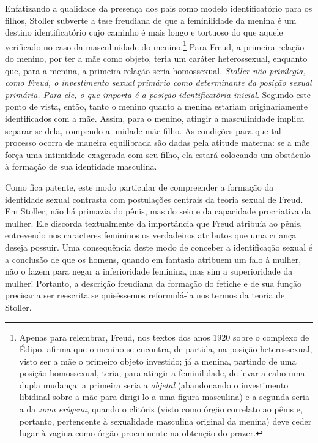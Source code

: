 Enfatizando a qualidade da presença dos pais como modelo identificatório
para os filhos, Stoller subverte a tese freudiana de que a feminilidade da
menina é um destino identificatório cujo caminho é mais longo e tortuoso do
que aquele verificado no caso da masculinidade do menino.\footnote{ Apenas
para relembrar, Freud, nos textos dos anos 1920 sobre o complexo de Édipo,
afirma que o menino se encontra, de partida, na posição heterossexual,
visto ser a mãe o primeiro objeto investido; já a menina, partindo de uma
posição homossexual, teria, para atingir a feminilidade, de levar a cabo
uma dupla mudança: a primeira seria a \textit{objetal} (abandonando o
investimento libidinal sobre a mãe para dirigi-lo a uma figura masculina) e
a segunda seria a da \textit{zona erógena}, quando o clitóris (visto como
órgão correlato ao pênis e, portanto, pertencente à sexualidade masculina
original da menina) deve ceder lugar à vagina como órgão proeminente na
obtenção do prazer.} Para Freud, a primeira relação do menino, por ter a
mãe como objeto, teria um caráter heterossexual, enquanto que, para a
menina, a primeira relação seria homossexual. \textit{Stoller não
privilegia, como Freud, o investimento sexual primário como determinante da
posição sexual primária. Para ele, o que importa é a posição
identificatória inicial}. Segundo este ponto de vista, então, tanto o
menino quanto a menina estariam originariamente identificados com a mãe.
Assim, para o menino, atingir a masculinidade implica separar-se dela,
rompendo a unidade mãe-filho. As condições para que tal processo ocorra de
maneira equilibrada são dadas pela atitude materna: se a mãe força uma
intimidade exagerada com seu filho, ela estará colocando um obstáculo à
formação de sua identidade masculina.

Como fica patente, este modo particular de compreender a formação da
identidade sexual contrasta com postulações centrais da teoria sexual de
Freud. Em Stoller, não há primazia do pênis, mas do seio e da capacidade
procriativa da mulher. Ele discorda textualmente da importância que Freud
atribuía ao pênis, entrevendo nos caracteres femininos os verdadeiros
atributos que uma criança deseja possuir. Uma consequência deste modo de
conceber a identificação sexual é a conclusão de que os homens, quando em
fantasia atribuem um falo à mulher, não o fazem para negar a inferioridade
feminina, mas sim a superioridade da mulher! Portanto, a descrição
freudiana da formação do fetiche e de sua função precisaria ser reescrita
se quiséssemos reformulá-la nos termos da teoria de Stoller.

